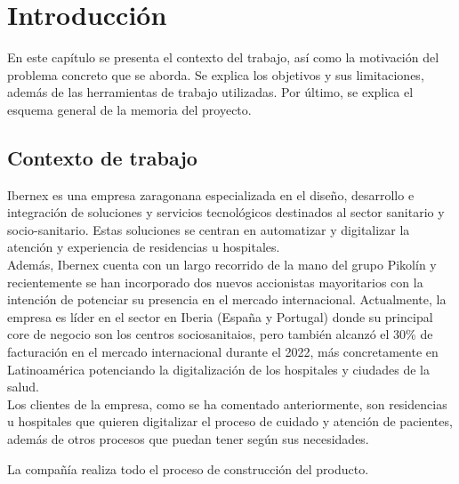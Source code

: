 \chapter{Introducción}
\label{ch:no_lineal}

En este capítulo se presenta el contexto del trabajo, así como la motivación del problema concreto que se aborda. Se explica los objetivos y sus limitaciones, además de las herramientas de trabajo utilizadas. Por último, se explica el esquema general de la memoria del proyecto.

\section{Contexto de trabajo}


 Ibernex es una empresa zaragonana especializada en el diseño, desarrollo e integración de soluciones y servicios tecnológicos destinados al sector sanitario y socio-sanitario. Estas soluciones se centran en automatizar y digitalizar la atención y experiencia de residencias u hospitales.\\

 Además, Ibernex cuenta con un largo recorrido de la mano del grupo Pikolín y recientemente se han incorporado dos nuevos accionistas mayoritarios con la intención de potenciar su presencia en el mercado internacional. Actualmente, la empresa es líder en el sector en Iberia (España y Portugal) donde su principal core de negocio son los centros sociosanitaios, pero también alcanzó el 30\% de facturación en el mercado internacional durante el 2022, más concretamente en Latinoamérica potenciando la digitalización de los hospitales y ciudades de la salud. \\

 Los clientes de la empresa, como se ha comentado anteriormente, son residencias u hospitales que quieren digitalizar el proceso de cuidado y atención de pacientes, además de otros procesos que puedan tener según sus necesidades. \newline



La compañía realiza todo el proceso de construcción del producto. \\

